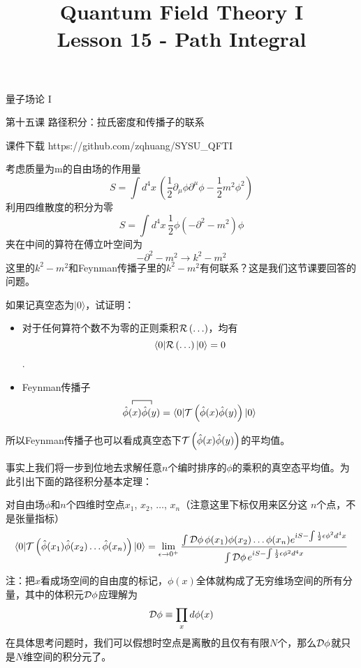 \documentclass[CJK]{beamer}
\title{Quantum Field Theory I \\ Lesson 15 - Path Integral}
\author{}
\date{}
\begin{document}
\begin{frame}
 
\begin{center}
\begin{Large}
\bch
量子场论 I 

{\vskip 0.3in}

第十五课 路径积分：拉氏密度和传播子的联系

\ech
\end{Large}
\end{center}

\vskip 0.2in

\bch
课件下载
\ech
https://github.com/zqhuang/SYSU\_QFTI

\end{frame}



\begin{frame}
\bch
{\small
考虑质量为m的自由场的作用量
$$S = \int d^4x\, \left(\frac{1}{2}\partial_\mu\phi\partial^\mu\phi - \frac{1}{2}m^2\phi^2\right)$$
利用四维散度的积分为零
$$S = \int d^4x\, \frac{1}{2}\phi(-\partial^2- m^2)\phi$$
夹在中间的算符在傅立叶空间为
$$-\partial^2 -m^2 \rightarrow k^2 - m^2$$
这里的$k^2-m^2$和Feynman传播子里的$k^2-m^2$有何联系？这是我们这节课要回答的问题。}
\ech
\end{frame}

\begin{frame}
\bch
如果记真空态为$|0\rangle$，试证明：
\begin{itemize}
\item{对于任何算符个数不为零的正则乘积$\mathcal{R}\left(\ldots\right)$，均有
$$\langle 0| \mathcal{R}\left(\ldots\right) | 0 \rangle = 0$$.}
\item{Feynman传播子
$$\contr{\hatphi(x)}{\hatphi(y)} =\langle 0 | \torder{\hatphi(x)\hatphi(y)} |0\rangle $$
}
\end{itemize}
所以Feynman传播子也可以看成真空态下$\mathcal{T}\left({\hat{\phi}}(x){\hat{\phi}}(y)\right)$的平均值。
\ech
\end{frame}


\begin{frame}
\bch
{\small
事实上我们将一步到位地去求解任意$n$个编时排序的$\phi$的乘积的真空态平均值。为此引出下面的路径积分基本定理：
\skipline

对自由场$\phi$和$n$个四维时空点$x_1$, $x_2$, $\ldots$, $x_n$（注意这里下标仅用来区分这 $n$个点，不是张量指标）
$$\langle 0 | \mathcal{T}\left({\hat{\phi}}(x_1){\hat{\phi}}(x_2)\ldots{\hat{\phi}}(x_n)\right) |0\rangle = \lim_{\epsilon\rightarrow 0^+}\frac{\int {\mathcal{D}}\phi\, \phi(x_1)\phi(x_2)\ldots\phi(x_n) e^{{\dot{\imath}} S - \int\frac{1}{2}\epsilon\phi^2d^4x} }{\int {\mathcal{D}}\phi \, e^{{\dot{\imath}} S - \int \frac{1}{2}\epsilon\phi^2d^4x}}$$
\skipline}

{\scriptsize
注：把$x$看成场空间的自由度的标记，$\phi(x)$全体就构成了无穷维场空间的所有分量，其中的体积元${\mathcal{D}} \phi$应理解为
$${\mathcal{D}}\phi \equiv \prod_x d\phi(x)$$
在具体思考问题时，我们可以假想时空点是离散的且仅有有限$N$个，那么${\mathcal{D}}\phi$就只是$N$维空间的积分元了。
}
\ech
\end{frame}
\end{document}
